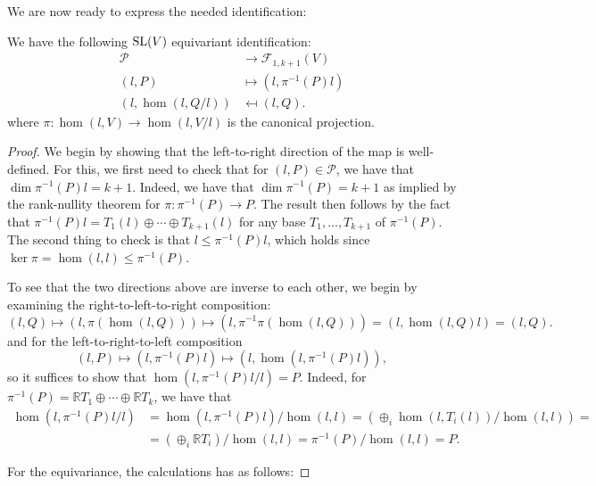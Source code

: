 \documentclass{report}
\begin{document}
We are now ready to express the needed identification:
\begin{proposition}
We have the following $\operatorname{{\mathrm{SL}}}(V)$ equivariant identification:
\begin{align*}
    \mathcal P &\to \mathcal F_{1, k+1}(V)\\
    (l, P) &\mapsto (l, \pi^{-1}(P)l)\\
    (l, \hom(l, Q/l)) &\mapsfrom (l, Q).
\end{align*}
where $\pi : \hom(l, V) \to \hom(l, V/l)$ is the canonical projection.
\end{proposition}
\begin{proof}
    We begin by showing that the left-to-right direction of the map is well-defined.
    For this, we first need to check that for $(l,P) \in \mathcal P$, we have that $\dim \pi^{-1}(P)l = k + 1$.
    Indeed, we have that $\dim \pi^{-1}(P) = k+1$ as implied by the rank-nullity theorem for $\pi: \pi^{-1}(P) \to P$.
    The result then follows by the fact that $\pi^{-1}(P)l = T_1(l) \oplus \cdots \oplus T_{k+1}(l)$ for any base $T_1, \ldots, T_{k+1}$ of $\pi^{-1}(P)$.
    The second thing to check is that $ l \leq \pi^{-1}(P)l$, which holds since $\ker \pi = \hom(l,l) \leq \pi^{-1}(P)$.

    To see that the two directions above are inverse to each other, we begin by examining the right-to-left-to-right composition:
    \[
    (l, Q) \mapsto (l, \pi(\hom(l, Q))) \mapsto (l, \pi^{-1}\pi(\hom(l, Q))) = (l, \hom(l, Q)l) = (l, Q).
    \]
    and for the left-to-right-to-left composition
    \[
        (l, P) \mapsto (l, \pi^{-1}(P)l) \mapsto (l, \hom(l, \pi^{-1}(P)l)),
    \]
    so it suffices to show that $\hom(l, \pi^{-1}(P)l/l) = P$.
    Indeed, for $\pi^{-1}(P) = \mathbb R T_1 \oplus \cdots \oplus \mathbb R T_k$, we have that
    \begin{align*}
        \hom(l, \pi^{-1}(P)l/l) &=
        \hom(l, \pi^{-1}(P)l)/\hom(l,l) =
        \left( \oplus_i \hom(l, T_i(l))/\hom(l,l)\right) =\\
        &= \left(\oplus_i \mathbb R T_i\right)/\hom(l,l) 
        = \pi^{-1}(P)/\hom(l,l) = P.
    \end{align*}

    For the equivariance, the calculations has as follows:

\end{proof}
\end{document}
